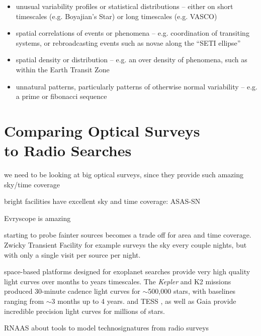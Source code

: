 \documentclass[twocolumn]{aastex62}
\newcommand{\Kepler}{\textsl{Kepler}\xspace}
\begin{document}
\begin{itemize}
\item unusual variability profiles or statistical distributions -- either on short timescales (e.g. Boyajian's Star) or long timescales (e.g. VASCO)
\item spatial correlations of events or phenomena -- e.g. coordination of transiting systems, or rebroadcasting events such as novae along the ``SETI ellipse'' \citep{makovetskii1977,lemarchand1994,tarter2001,shostak2004}
\item spatial density or distribution -- e.g. an over density of phenomena, such as within the Earth Transit Zone \citep{heller2016}
\item unnatural patterns, particularly patterns of otherwise normal variability -- e.g. a prime or fibonacci sequence
\end{itemize}




\section{Comparing Optical Surveys\\ to Radio Searches}
\label{sec:haystack}



we need to be looking at big optical surveys, since they provide such amazing sky/time coverage

bright facilities have excellent sky and time coverage:
ASAS-SN \citep{kochanek2017}

Evryscope \citep{law2015} is amazing

starting to probe fainter sources becomes a trade off for area and time coverage.
Zwicky Transient Facility \citep{bellm2014}
for example surveys the sky every couple nights, but with only a single visit per source per night.


space-based platforms designed for exoplanet searches provide very high quality light curves over months to years timescales. The \Kepler and K2 missions \citep{borucki2010,howell2014} produced 30-minute cadence light curves for $\sim$500,000 stars, with baselines ranging from $\sim$3 months up to 4 years. 
and TESS \citep{tess}, as well as Gaia \citep{gaia} provide incredible precision light curves for millions of stars.



RNAAS about tools to model technosignatures from radio surveys
\citep{forgan2019}
\end{document}
